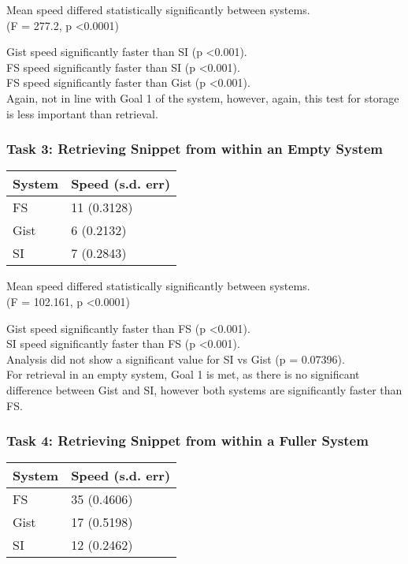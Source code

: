 Mean speed differed statistically significantly between systems. \\
(F = 277.2, p \textless 0.0001)

Gist speed significantly faster than SI (p \textless 0.001). \\
FS speed significantly faster than SI (p \textless 0.001). \\
FS speed significantly faster than Gist (p \textless 0.001). \\

Again, not in line with Goal 1 of the system, however, again, this test for storage is less important than retrieval.

\subsubsection{Task 3: Retrieving Snippet from within an Empty System}
\begin{table}[H]
\label{speedtabletask3}
\begin{tabular}{ll}
\hline
\textbf{System} & \textbf{Speed (s.d. err)} \\ \hline
FS              & 11 (0.3128)     \\ 
Gist            & 6 (0.2132)     \\ 
SI              & 7 (0.2843)     \\ \hline
\end{tabular}
\end{table}

Mean speed differed statistically significantly between systems. \\
(F = 102.161, p \textless 0.0001)

Gist speed significantly faster than FS (p \textless 0.001). \\
SI speed significantly faster than FS (p \textless 0.001). \\
Analysis did not show a significant value for SI vs Gist (p = 0.07396). \\

For retrieval in an empty system, Goal 1 is met, as there is no significant difference between Gist and SI, however both systems are significantly faster than FS.

\subsubsection{Task 4: Retrieving Snippet from within a Fuller System}
\begin{table}[H]
\label{speedtabletask4}
\begin{tabular}{ll}
\hline
\textbf{System} & \textbf{Speed (s.d. err)} \\ \hline
FS              & 35 (0.4606)     \\ 
Gist            & 17 (0.5198)     \\ 
SI              & 12 (0.2462)     \\ \hline
\end{tabular}
\end{table}

